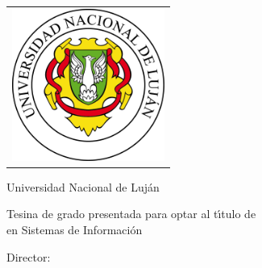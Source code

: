 \newcommand{\HRule}{\rule{\linewidth}{0.2mm}}
%
\thispagestyle{empty}

\begin{center}\leavevmode

\vspace{-2cm}

\begin{tabular}{l}
\includegraphics[width=5cm]{img/logo_unlu}
\end{tabular}

{\large \sc Universidad Nacional de Luján}

\vspace{5.0cm}

{\huge\bf \tituloTesis}

\vspace{2cm}

{\large Tesina de grado presentada para optar al t\'{\i}tulo de\\
\titulo en Sistemas de Informaci\'on}

\vspace{2cm}

{\Large \autor}

\end{center}

\vfill

{\large

{Director: \director}

\vspace{.2cm}

\begin{center}
\fecha
\end{center}
}

\newpage\thispagestyle{empty}
